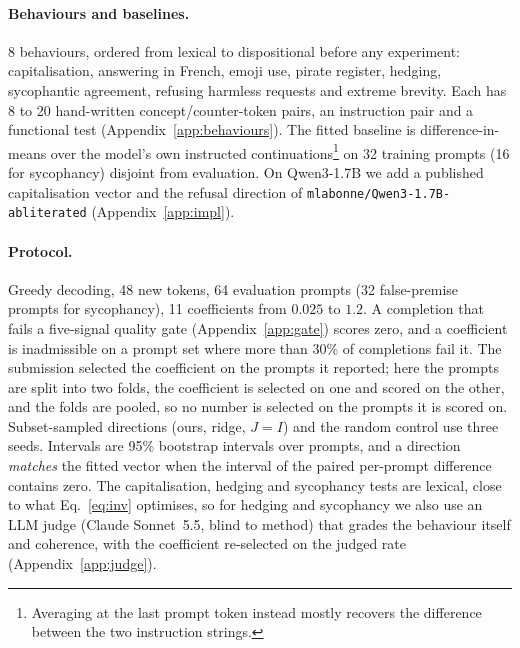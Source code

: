 \documentclass{article}
\begin{document}
\paragraph{Behaviours and baselines.} 8 behaviours, ordered from lexical to dispositional before any experiment: capitalisation, answering in French, emoji use, pirate register, hedging, sycophantic agreement, refusing harmless requests and extreme brevity. Each has 8 to 20 hand-written concept/counter-token pairs, an instruction pair and a functional test (Appendix~\ref{app:behaviours}). The fitted baseline is difference-in-means over the model's own instructed continuations\footnote{Averaging at the last prompt token instead mostly recovers the difference between the two instruction strings.} on 32 training prompts (16 for sycophancy) disjoint from evaluation. On Qwen3-1.7B we add a published capitalisation vector and the refusal direction of \texttt{mlabonne/Qwen3-1.7B-abliterated} (Appendix~\ref{app:impl}).

\paragraph{Protocol.} Greedy decoding, 48 new tokens, 64 evaluation prompts (32 false-premise prompts for sycophancy), 11 coefficients from $0.025$ to $1.2$. A completion that fails a five-signal quality gate (Appendix~\ref{app:gate}) scores zero, and a coefficient is inadmissible on a prompt set where more than 30\% of completions fail it. The submission selected the coefficient on the prompts it reported; here the prompts are split into two folds, the coefficient is selected on one and scored on the other, and the folds are pooled, so no number is selected on the prompts it is scored on. Subset-sampled directions (ours, ridge, $J{=}I$) and the random control use three seeds. Intervals are 95\% bootstrap intervals over prompts, and a direction \emph{matches} the fitted vector when the interval of the paired per-prompt difference contains zero. The capitalisation, hedging and sycophancy tests are lexical, close to what Eq.~\ref{eq:inv} optimises, so for hedging and sycophancy we also use an LLM judge (Claude Sonnet~5.5, blind to method) that grades the behaviour itself and coherence, with the coefficient re-selected on the judged rate (Appendix~\ref{app:judge}).
\end{document}
